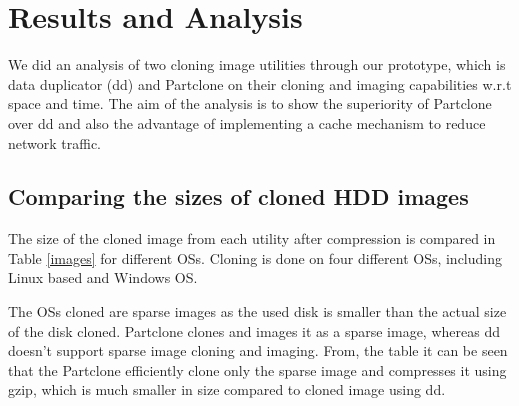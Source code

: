 \documentclass[a4paper,12pt]{article}
\begin{document}
\section{\fontsize{16pt}{1em} Results and Analysis}
We did an analysis of two cloning image utilities through our prototype, which is data duplicator (dd) and Partclone on their cloning and imaging capabilities w.r.t space and time. The aim of the analysis is to show the superiority of Partclone over dd and also the advantage of implementing a cache mechanism to reduce network traffic.

\subsection{ Comparing the sizes of cloned HDD images}

The size of the cloned image from each utility after compression is compared in Table \ref{images} for different OSs. Cloning is done on four different OSs, including Linux based and Windows OS. 

The OSs cloned are sparse images as the used disk is smaller than the actual size of the disk cloned. Partclone clones and images it as a sparse image, whereas dd doesn't support sparse image cloning and imaging. From, the table it can be seen that the Partclone efficiently clone only the sparse image and compresses it using gzip, which is much smaller in size compared to cloned image using dd.
\end{document}
